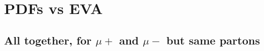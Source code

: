 \documentclass[a4paper,11pt]{article}
\begin{document}
\clearpage
\section{PDFs vs EVA}

\subsection{All together, for $\mu+$ and $\mu-$ but same partons}







\end{document}
